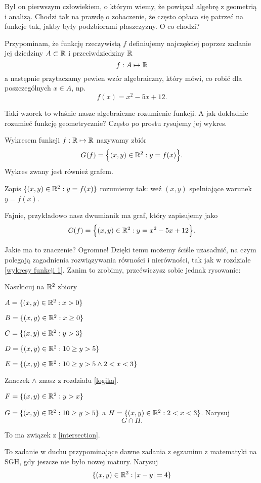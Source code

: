 Był on pierwszym człowiekiem, o którym wiemy, że powiązał algebrę z geometrią i analizą. Chodzi tak na prawdę o zobaczenie, że często opłaca się patrzeć na funkcje tak, jakby były podzbiorami płaszczyzny. O co chodzi? 

Przypominam, że funkcję rzeczywistą $f$ definiujemy najczęściej poprzez zadanie jej dziedziny $A \subset \mathbb{R}$ i przeciwdziedziny $\mathbb{R}$
$$f: A \mapsto \mathbb{R}$$
a następnie przytaczamy pewien wzór algebraiczny, który mówi, co robić dla poszczególnych $x \in A$, np. 
$$f(x) = x^2 - 5x + 12.$$

Taki wzorek to właśnie nasze algebraiczne rozumienie funkcji. A jak dokładnie rozumieć funkcję geometrycznie? Często po prostu rysujemy jej wykres. 

\begin{mydef} 
	Wykresem funkcji $f: \mathbb{R} \mapsto \mathbb{R}$ nazywamy zbiór $$G(f) = \Big \{ (x,y) \in \mathbb{R}^2 : y = f(x) \Big \}.$$ Wykres zwany jest również grafem.
\end{mydef}

Zapis $\{ (x,y) \in \mathbb{R}^2 : y = f(x)\}$ rozumiemy tak: weź $(x,y)$ spełniające warunek $y=f(x)$.

Fajnie, przykładowo nasz dwumianik ma graf, który zapisujemy jako $$G(f) = \Big \{ (x,y) \in \mathbb{R}^2 : y = x^2 - 5x + 12 \Big \}.$$

Jakie ma to znaczenie? Ogromne! Dzięki temu możemy ściśle uzasadnić, na czym polegają zagadnienia rozwiązywania równości i nierówności, tak jak w rozdziale \ref{wykresy funkcji 1}. Zanim to zrobimy, przećwiczysz sobie jednak rysowanie:

\begin{task}
	\item Naszkicuj na $\mathbb{R}^2$ zbiory
	\begin{task}
		\item $A = \{ (x,y) \in \mathbb{R}^2 : x > 0\}$
		\item $B = \{ (x,y) \in \mathbb{R}^2 : x \geq 0\}$
		\item $C = \{ (x,y) \in \mathbb{R}^2 : y > 3\}$
		\item $D = \{ (x,y) \in \mathbb{R}^2 : 10 \geq y > 5\}$		
		\item $E = \{ (x,y) \in \mathbb{R}^2 : 10 \geq y > 5 \wedge 2 < x < 3\}$\label{intersection}
		\item[]\tip Znaczek $\wedge$ znasz z rozdziału \ref{logika}.
		\item $F = \{ (x,y) \in \mathbb{R}^2 : y > x\}$								
	\end{task}
	\item $G = \{ (x,y) \in \mathbb{R}^2 : 10 \geq y > 5 \}$ a $H  = \{ (x,y) \in \mathbb{R}^2 :  2 < x < 3\}$. Narysuj $$G \cap H.$$
	\item[]\tip To ma związek z \ref{intersection}.
	\item To zadanie w duchu przypominające dawne zadania z egzaminu z matematyki na SGH, gdy jeszcze nie było nowej matury. Narysuj $$\{ (x,y) \in \mathbb{R}^2 : |x-y| = 4\}$$
\end{task}







